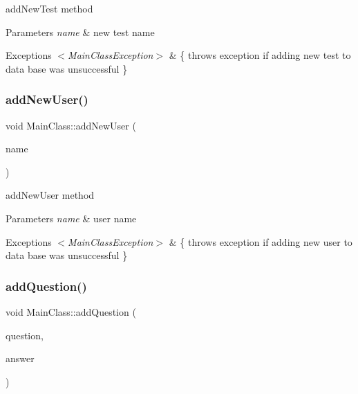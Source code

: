 add\+New\+Test method 


\begin{DoxyParams}{Parameters}
{\em name} & new test name \\
\hline
\end{DoxyParams}

\begin{DoxyExceptions}{Exceptions}
{\em $<$\+Main\+Class\+Exception$>$} & \{ throws exception if adding new test to data base was unsuccessful \} \\
\hline
\end{DoxyExceptions}
\mbox{\label{class_main_class_a23203055dd5db7147ba38531ab3814b3}} 
\subsubsection{\texorpdfstring{add\+New\+User()}{addNewUser()}}
{\footnotesize\ttfamily void Main\+Class\+::add\+New\+User (\begin{DoxyParamCaption}\item[{const Q\+String \&}]{name }\end{DoxyParamCaption})}



add\+New\+User method 


\begin{DoxyParams}{Parameters}
{\em name} & user name \\
\hline
\end{DoxyParams}

\begin{DoxyExceptions}{Exceptions}
{\em $<$\+Main\+Class\+Exception$>$} & \{ throws exception if adding new user to data base was unsuccessful \} \\
\hline
\end{DoxyExceptions}
\mbox{\label{class_main_class_a23153f89d54388726288e652fb9f1577}} 
\subsubsection{\texorpdfstring{add\+Question()}{addQuestion()}}
{\footnotesize\ttfamily void Main\+Class\+::add\+Question (\begin{DoxyParamCaption}\item[{Q\+String}]{question,  }\item[{Q\+String}]{answer }\end{DoxyParamCaption})}



